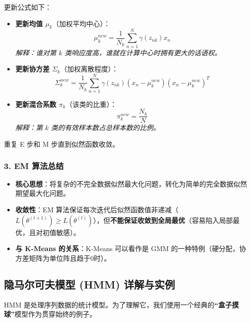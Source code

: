 \documentclass[a4paper, 11pt]{ctexart}
\begin{document}
更新公式如下：

\begin{itemize}
    \item \textbf{更新均值 $\mu_k$}（加权平均中心）：
    \begin{equation}
        \mu_k^{new} = \frac{1}{N_k} \sum_{n=1}^N \gamma(z_{nk}) x_n
    \end{equation}
    \textit{解释：谁对第 $k$ 类响应度高，谁就在计算中心时拥有更大的话语权。}

    \item \textbf{更新协方差 $\Sigma_k$}（加权离散程度）：
    \begin{equation}
        \Sigma_k^{new} = \frac{1}{N_k} \sum_{n=1}^N \gamma(z_{nk}) (x_n - \mu_k^{new})(x_n - \mu_k^{new})^T
    \end{equation}
    
    \item \textbf{更新混合系数 $\pi_k$}（该类的比重）：
    \begin{equation}
        \pi_k^{new} = \frac{N_k}{N}
    \end{equation}
    \textit{解释：第 $k$ 类的有效样本数占总样本数的比例。}
\end{itemize}

重复 E 步和 M 步直到似然函数收敛。

\subsubsection{3. EM 算法总结}
\begin{itemize}
    \item \textbf{核心思想}：将复杂的不完全数据似然最大化问题，转化为简单的完全数据似然期望最大化问题。
    \item \textbf{收敛性}：EM 算法保证每次迭代后似然函数值非递减（$L(\theta^{(t+1)}) \ge L(\theta^{(t)})$），但\textbf{不能保证收敛到全局最优}（容易陷入局部最优，且对初值敏感）。
    \item \textbf{与 K-Means 的关系}：K-Means 可以看作是 GMM 的一种特例（硬分配，协方差矩阵为单位阵且趋于0时）。
\end{itemize}

\subsection{隐马尔可夫模型 (HMM) 详解与实例}

HMM 是处理序列数据的统计模型。为了理解它，我们使用一个经典的\textbf{“盒子摸球”}模型作为贯穿始终的例子。
\end{document}
